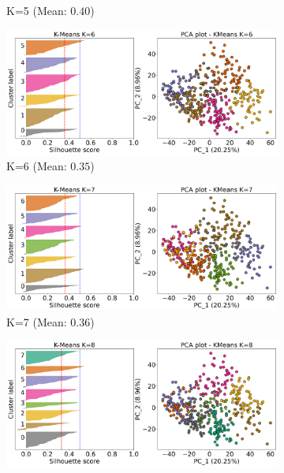 \begin{figure}[H]
\begin{subfigure}[!t]{0.49\textwidth}
        \caption{K=5 (Mean: $0.40$)}
    \end{subfigure}
    \centering
    \begin{subfigure}[!t]{0.49\textwidth}
        \includegraphics[width=\textwidth]{Sections/ClusteringAnalysis/Resources/cs_top3/sill_distrib/KMeans_6_sill_distrib.png}
        \caption{K=6 (Mean: $0.35$)}
    \end{subfigure}
    \centering
    \begin{subfigure}[!t]{0.49\textwidth}
        \includegraphics[width=\textwidth]{Sections/ClusteringAnalysis/Resources/cs_top3/sill_distrib/KMeans_7_sill_distrib.png}
        \caption{K=7 (Mean: $0.36$)}
    \end{subfigure}
    \centering
    \begin{subfigure}[!t]{0.49\textwidth}
        \includegraphics[width=\textwidth]{Sections/ClusteringAnalysis/Resources/cs_top3/sill_distrib/KMeans_8_sill_distrib.png}

\end{subfigure}
\end{figure}
